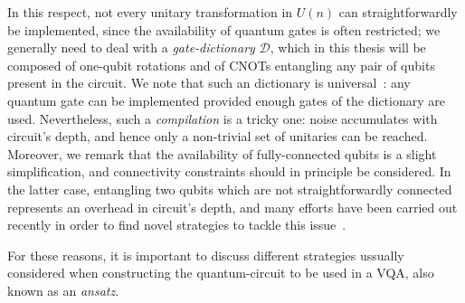 In this respect, not every unitary transformation in $U(n)$ can straightforwardly be implemented, since the availability of quantum gates is often restricted; we generally need to deal with a \textit{gate-dictionary} $\mathcal{D}$, which in this thesis will be composed of one-qubit rotations and of CNOTs entangling any pair of qubits present in the circuit. We note that such an dictionary is universal~\cite{nielsen00}: any quantum gate can be implemented provided enough gates of the dictionary are used. Nevertheless, such a \textit{compilation} is a tricky one: noise accumulates with circuit's depth, and hence only a non-trivial set of unitaries can be reached. Moreover, we remark that the availability of fully-connected qubits is a slight simplification, and connectivity constraints should in principle be considered. In the latter case, entangling two qubits which are not straightforwardly connected represents an overhead in circuit's depth, and many efforts have been carried out recently in order to find novel strategies to tackle this issue~\cite{compilingDeepRLmaster}.

For these reasons, it is important to discuss different strategies ussually considered when constructing the quantum-circuit to be used in a VQA, also known as an \textit{ansatz}. %
